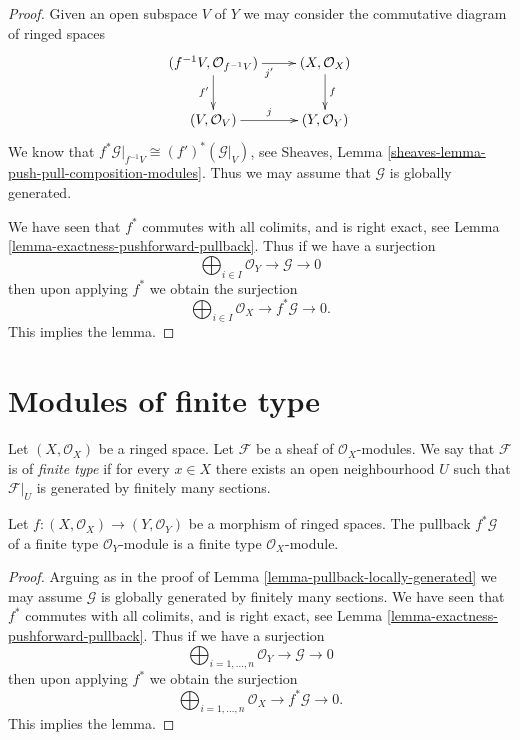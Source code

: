 \begin{proof}
Given an open subspace $V$ of $Y$ we may
consider the commutative diagram of ringed spaces
$$
\xymatrix{
(f^{-1}V, \mathcal{O}_{f^{-1}V}) \ar[r]_{j'} \ar[d]_{f'} &
(X, \mathcal{O}_X) \ar[d]^f \\
(V, \mathcal{O}_V) \ar[r]^j &
(Y, \mathcal{O}_Y)
}
$$
We know that $f^*\mathcal{G}|_{f^{-1}V} \cong (f')^*(\mathcal{G}|_V)$,
see Sheaves, Lemma \ref{sheaves-lemma-push-pull-composition-modules}.
Thus we may assume that $\mathcal{G}$ is globally generated.

\medskip\noindent
We have seen that $f^*$ commutes with all colimits,
and is right exact, see Lemma \ref{lemma-exactness-pushforward-pullback}.
Thus if we have a surjection
$$
\bigoplus\nolimits_{i \in I}
\mathcal{O}_Y
\to
\mathcal{G}
\to
0
$$
then upon applying $f^*$ we obtain the surjection
$$
\bigoplus\nolimits_{i \in I}
\mathcal{O}_X
\to
f^*\mathcal{G}
\to
0.
$$
This implies the lemma.
\end{proof}












\section{Modules of finite type}
\label{section-finite-type}

\begin{definition}
\label{definition-finite-type}
\begin{reference}
\cite[Chapter I, \S 2, no. 12, Definition 1, p. 207]{FAC}
\end{reference}
Let $(X, \mathcal{O}_X)$ be a ringed space.
Let $\mathcal{F}$ be a sheaf of $\mathcal{O}_X$-modules.
We say that $\mathcal{F}$ is of {\it finite type}
if for every $x \in X$ there exists an open
neighbourhood $U$ such that $\mathcal{F}|_U$
is generated by finitely many sections.
\end{definition}

\begin{lemma}
\label{lemma-pullback-finite-type}
Let $f : (X, \mathcal{O}_X) \to (Y, \mathcal{O}_Y)$
be a morphism of ringed spaces.
The pullback $f^*\mathcal{G}$ of a finite type
$\mathcal{O}_Y$-module is a finite type $\mathcal{O}_X$-module.
\end{lemma}

\begin{proof}
Arguing as in the proof of Lemma \ref{lemma-pullback-locally-generated}
we may assume $\mathcal{G}$ is globally generated by finitely
many sections.
We have seen that $f^*$ commutes with all colimits,
and is right exact, see Lemma \ref{lemma-exactness-pushforward-pullback}.
Thus if we have a surjection
$$
\bigoplus\nolimits_{i = 1, \ldots, n}
\mathcal{O}_Y
\to
\mathcal{G}
\to
0
$$
then upon applying $f^*$ we obtain the surjection
$$
\bigoplus\nolimits_{i = 1, \ldots, n}
\mathcal{O}_X
\to
f^*\mathcal{G}
\to
0.
$$
This implies the lemma.
\end{proof}

